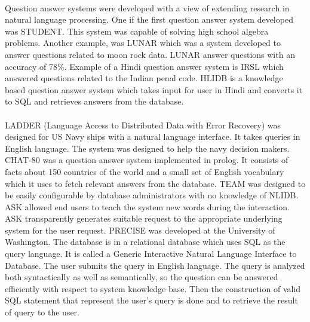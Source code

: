 \paragraph{}
Question answer systems were developed with a view of extending research in natural language processing. One if the first question answer system developed was STUDENT. This system was capable of solving high school algebra problems. Another example,  was LUNAR which was a system developed to answer questions related to moon rock data. LUNAR answer questions with an accuracy of 78\%. Example of a Hindi question answer system is IRSL which answered questions related to the Indian penal code. HLIDB is a knowledge based question answer system which takes input for user in Hindi and converts it to SQL and retrieves answers from the database. 

\paragraph{}
LADDER (Language Access to Distributed Data with Error Recovery) was designed for US Navy ships with a natural language interface. It takes queries in English language. The system was designed to help the navy decision makers. CHAT-80 was a question answer system implemented in prolog. It consists of facts about 150 countries of the world and a small set of English vocabulary which it uses to fetch relevant answers from the database. TEAM was designed to be easily configurable by database administrators with no knowledge of NLIDB. ASK allowed end users to teach the system new words during the interaction. ASK transparently generates suitable request to the appropriate underlying system for the user request. PRECISE was developed at the University of Washington. The database is in a relational database which uses SQL as the query language. It is called a Generic Interactive Natural Language Interface to Database. The user submits the query in English language. The query is analyzed both syntactically as well as semantically, so the question can be answered efficiently with respect to system knowledge base. Then the construction of valid SQL statement that represent the user's query is done and to retrieve the result of query to the user.

